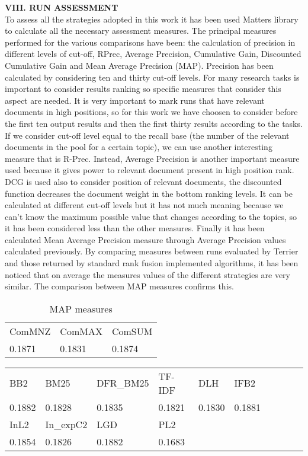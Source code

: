 \documentclass[12pt,journal]{IEEEtran}
\begin{document}
\textbf{VIII.	RUN ASSESSMENT} \\
To assess all the strategies adopted in this work it has been used Matters library to calculate all the necessary assessment measures.
The principal measures performed for the various comparisons have been: the calculation of precision in different levels of cut-off, RPrec, Average Precision, Cumulative Gain, Discounted Cumulative Gain and Mean Average Precision (MAP).
Precision has been calculated by considering ten and thirty cut-off levels. For many research tasks is important to consider results ranking so specific measures that consider this aspect are needed. It is very important to mark runs that have relevant documents in high positions, so for this work we have choosen to consider before the first ten output results and then the first thirty results according to the tasks. If we consider cut-off level equal to the recall base (the number of the relevant documents in the pool for a certain topic), we can use another interesting measure that is R-Prec.
Instead, Average Precision is another important measure used because it gives power to relevant document present in high position rank.
DCG is used also to consider position of relevant documents, the discounted function decreases the document weight in the bottom ranking levels. It can be calculated at different cut-off levels but it has not much meaning because we can’t know the maximum possible value that changes according to the topics, so it has been considered less than the other measures. Finally it has been calculated Mean Average Precision measure through Average Precision values calculated previously.
By comparing measures between runs evaluated by Terrier and those returned by standard rank fusion implemented algorithms, it has been noticed that on average the measures values of the different strategies are very similar. The comparison between MAP measures confirms this.

\begin{table}[h!]
\centering
\caption{MAP measures}
\begin{tabular}{|l|l|l|}
\hline
ComMNZ & ComMAX & ComSUM \\
0.1871 & 0.1831 & 0.1874 \\ \hline
\end{tabular}
\end{table}

\begin{table}[h!]
\centering
\begin{tabular}{|l|l|l|l|l|l|l|l|l|l|}
\hline
BB2    & BM25   & DFR\_BM25 & TF-IDF & DLH & IFB2     \\
0.1882 & 0.1828 & 0.1835    & 0.1821 & 0.1830 & 0.1881 \\ \hline
InL2   & In\_expC2 & LGD    & PL2    &        &       \\
0.1854 & 0.1826    & 0.1882 & 0.1683 &        & \\ \hline
\end{tabular}
\end{table}
\end{document}
